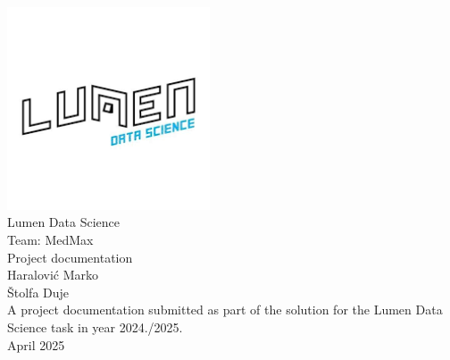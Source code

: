 \documentclass[a4paper,11pt,oneside]{book}
\begin{document}
    
    \frontmatter    
    \begin{titlepage}      
        \begin{center}
            \includegraphics[width=6cm]{figures/lumen_logo.png}\\[0.5cm]
            {\LARGE Lumen Data Science\\[0.5cm]
           Team: MedMax}\\[2cm]

            \linespread{1.2}\huge {
                Project documentation
            }
            \linespread{1}~\\[2cm]
            {\Large Haralović Marko} \\ [0.001cm] 
            {\Large Štolfa Duje}\\[1cm] 

            {\large 
            A project documentation submitted as part of the solution for the Lumen Data Science task in year 2024./2025.} \\ 
            {\large April 2025}          
        \end{center}
    \end{titlepage}

    \tableofcontents
    \listoffigures
    \listoftables
    \listofmyequation

    \mainmatter
    
    
    
    
    
    

    \begin{appendices}
    
    
      
    \end{appendices}
    
    
    
    
\end{document}
